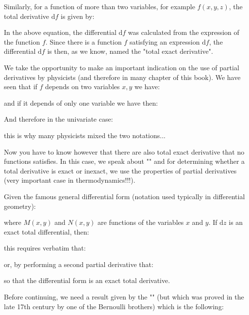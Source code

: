 	\begin{tcolorbox}[title=Remark,colframe=black,arc=10pt]
Similarly, for a function of more than two variables, for example $f(x,y,z)$, the total derivative $\mathrm{d}f$ is given by:
	
	In the above equation, the differential $\mathrm{d}f$ was calculated from the expression of the function $f$. Since there is a function $f$ satisfying an expression $\mathrm{d}f$, the differential $\mathrm{d}f$ is then, as we know, named the "total exact derivative".
	\end{tcolorbox}	
	
	We take the opportunity to make an important indication on the use of partial derivatives by physicists (and therefore in many chapter of this book). We have seen that if $f$ depends on two variables $x, y$ we have:
	
	and if it depends of only one variable we have then:
	
	And therefore in the univariate case:
	
	this is why many physicists mixed the two notations...
	
	Now you have to know however that there are also total exact derivative that no functions satisfies. In this case, we speak about "\label{total inexact derivative}" and for determining whether a total derivative is exact or inexact, we use the properties of partial derivatives (very important case in thermodynamics!!!).
	
	Given the famous general differential form (notation used typically in differential geometry):
	
	where $M (x, y)$ and $N (x, y)$ are functions of the variables $x$ and $y$. If $\mathrm{d}z$ is an exact total differential, then:
	
	this requires verbatim that:
	
	or, by performing a second partial derivative that:
	
	so that the differential form is an exact total derivative.
	
	Before continuing, we need a result given by the "\label{Schwarz theorem}" (but which was proved in the late 17th century by one of the Bernoulli brothers) which is the following:
	
